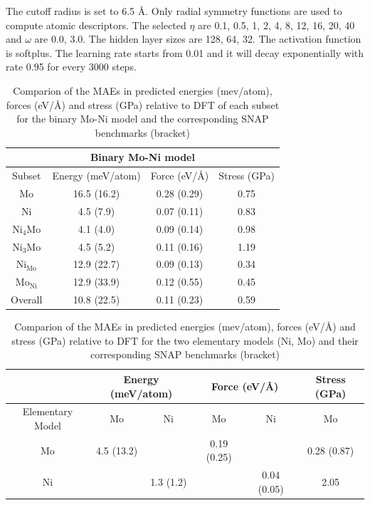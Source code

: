 \documentclass[final,1p,times]{elsarticle}
\begin{document}
The cutoff radius is set to 6.5 \AA. Only radial symmetry 
functions are used to compute atomic descriptors. The selected $\eta$ are 
0.1, 0.5, 1, 2, 4, 8, 12, 16, 20, 40 and $\omega$ are 0.0, 3.0. The hidden layer
sizes are 128, 64, 32. The activation function is softplus.
The learning rate starts from 0.01 and it will decay exponentially with rate 
0.95 for every 3000 steps.

% 
%
\begin{table}[h]
\centering
\begin{tabular}{cccc}
\hline
\multicolumn{4}{c}{Binary Mo-Ni model} \\
\hline
Subset & Energy (meV/atom) & Force (eV/\AA) & Stress (GPa) \\
\hline
Mo & 16.5 (16.2) & 0.28 (0.29) & 0.75 \\
Ni & 4.5 (7.9)   & 0.07 (0.11) & 0.83 \\
Ni$_4$Mo & 4.1 (4.0) & 0.09 (0.14) & 0.98 \\ 
Ni$_3$Mo & 4.5 (5.2) & 0.11 (0.16) & 1.19 \\
Ni$_{\mathrm{Mo}}$ & 12.9 (22.7) & 0.09 (0.13)& 0.34 \\
Mo$_{\mathrm{Ni}}$ & 12.9 (33.9) & 0.12 (0.55)& 0.45 \\
Overall & 10.8 (22.5)& 0.11 (0.23) & 0.59 \\
\hline
\end{tabular}
\caption{\label{table:MAE}
Comparion of the MAEs in predicted energies (mev/atom), forces (eV/\AA) and 
stress (GPa) relative to DFT of each subset for the binary Mo-Ni model and the
corresponding SNAP benchmarks (bracket)}
\end{table}

\begin{table}[h]
\centering
\begin{tabular}{ccc|cc|c}
\hline
  & \multicolumn{2}{c|}{Energy (meV/atom)} & \multicolumn{2}{c|}{Force (eV/\AA)}
  & Stress (GPa) \\
\hline
Elementary Model & Mo         & Ni        & Mo            & Ni   & Mo          \\
\hline
Mo               & 4.5 (13.2) &           & 0.19 (0.25)   &      & 0.28 (0.87) \\
Ni               &            & 1.3 (1.2) & & 0.04 (0.05) & 2.05               \\
\hline
\end{tabular}
\caption{\label{table:MAE1}
Comparion of the MAEs in predicted energies (mev/atom), forces (eV/\AA) and 
stress (GPa) relative to DFT for the two elementary models (Ni, Mo) and their
corresponding SNAP benchmarks (bracket)}
\end{table}
\end{document}
